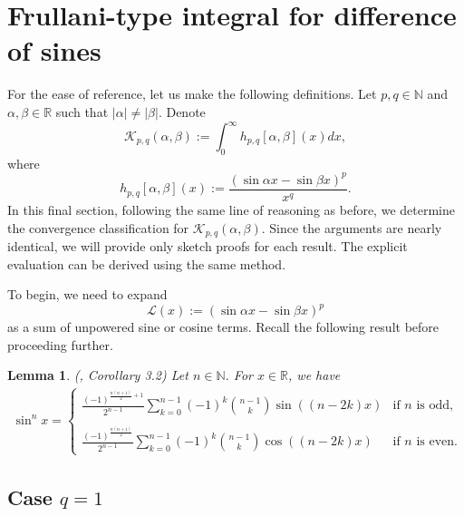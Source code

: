 \documentclass[12pt, reqno]{amsart}
\theoremstyle{plain}
\newtheorem{lemma}[theorem]{Lemma}
\theoremstyle{definition}
\begin{document}


\section{Frullani-type integral for difference of sines}\label{sec6}

For the ease of reference, let us make the following definitions.
Let $p, q\in\mathbb{N}$ and $\alpha, \beta\in\mathbb{R}$ such that $|\alpha|\ne|\beta|$. Denote
\[\mathcal{K}_{p, q}(\alpha, \beta):=\int_0^{\infty}h_{p, q}[\alpha, \beta](x)dx,\]
where
\[h_{p, q}[\alpha, \beta](x):=\frac{(\sin \alpha x-\sin \beta x)^p}{x^q}.\]
In this final section, following the same line of reasoning as before, we determine the convergence classification for $\mathcal{K}_{p, q}(\alpha, \beta)$. Since the arguments are nearly identical, we will provide only sketch proofs for each result. The explicit evaluation can be derived using the same method.

To begin, we need to expand
\[
\mathcal{L}(x) := (\sin \alpha x - \sin \beta x)^p
\]
as a sum of unpowered sine or cosine terms. Recall the following result before proceeding further.

\begin{lemma}\label{lem6.1}(\cite{AL}, Corollary 3.2)
	Let $n\in\mathbb{N}$. For $x\in\mathbb{R}$, we have
	\begin{align*}
		\sin^nx=\begin{cases}
			\displaystyle\frac{(-1)^{\frac{n(n+1)}{2}+1}}{2^{n-1}}\sum_{k=0}^{n-1}(-1)^k\binom{n-1}{k}\sin((n-2k)x) &\text{if $n$ is odd},\\\\
			\displaystyle\frac{(-1)^{\frac{n(n+1)}{2}}}{2^{n-1}}\sum_{k=0}^{n-1}(-1)^k\binom{n-1}{k}\cos((n-2k)x) &\text{if $n$ is even}.
		\end{cases}
	\end{align*}
\end{lemma}



\subsection{Case $q=1$}
\end{document}
